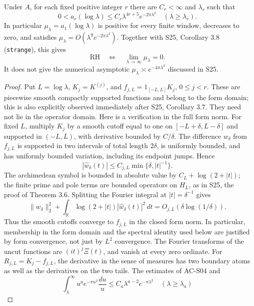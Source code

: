 \begin{theorem}
\label{AC-S05}
Under \(A\), for each fixed positive integer \(r\) there are
\(C_r<\infty\) and \(\lambda_r\) such that
\[
 0<a_r(\log\lambda)
 \leq C_r\lambda^{4r+5}e^{-2\pi\lambda^2}
 \quad(\lambda\geq\lambda_r).
\]
In particular \(\mu_\lambda=a_1(\log\lambda)\) is positive for every
finite window, decreases to zero, and satisfies
\(\mu_\lambda=O(\lambda^9e^{-2\pi\lambda^2})\).
Together with S25, Corollary 3.8 (\texttt{strange}), this gives
\[
 \mathrm{RH}\quad\Longleftrightarrow\quad
 \lim_{\lambda\to\infty}\mu_\lambda=0.
\]
It does not give the numerical asymptotic
\(\mu_\lambda\asymp e^{-4\pi\lambda^2}\) discussed in S25.
\end{theorem}
\begin{proof}
Put \(L=\log\lambda\), \(K_j=K^{(j)}\), and
\(f_{j,L}=1_{[-L,L]}K_j\), \(0\leq j<r\).
These are piecewise smooth compactly supported functions and belong
to the form domain; this is also explicitly observed immediately after
S25, Corollary 3.7.  They need not lie in the operator domain.
Here is a verification in the full form norm.  For fixed \(L\), multiply
\(K_j\) by a smooth cutoff equal to one on
\([-L+\delta,L-\delta]\) and supported in \((-L,L)\), with derivative
bounded by \(C/\delta\).  The difference \(w_\delta\) from
\(f_{j,L}\) is supported in two intervals of total length \(2\delta\),
is uniformly bounded, and has uniformly bounded variation, including
its endpoint jumps.  Hence
\[
 |\widehat w_\delta(t)|\leq C_{j,L}
                   \min\{\delta,|t|^{-1}\}.
\]
The archimedean symbol is bounded in absolute value by
\(C_L+\log(2+|t|)\); the finite prime and pole terms are bounded
operators on \(H_L\), as in S25, the proof of Theorem 3.6.
Splitting the Fourier integral at \(|t|=\delta^{-1}\) gives
\[
 \|w_\delta\|_2^2+
 \int_{\mathbb R}\log(2+|t|)|\widehat w_\delta(t)|^2\,dt
       =O_{j,L}(\delta\log(1/\delta)).
\]
Thus the smooth cutoffs converge to \(f_{j,L}\) in the closed form
norm.  In particular, membership in the form domain and the spectral
identity used below are justified by form convergence, not just by
\(L^2\) convergence.
The Fourier transforms of the uncut functions are
\((it)^j\Xi(t)\), and vanish at every zero ordinate.
For \(R_{j,L}=K_j-f_{j,L}\), the derivative in the sense of measures
has two boundary atoms as well as the derivatives on the two tails.
The estimates of AC-S04 and
\[
 \int_\lambda^\infty u^a e^{-\pi u^2}\frac{du}{u}
       \leq C_a\lambda^{a-2}e^{-\pi\lambda^2}
 \quad(\lambda\geq\lambda_a)
\]
\end{proof}
